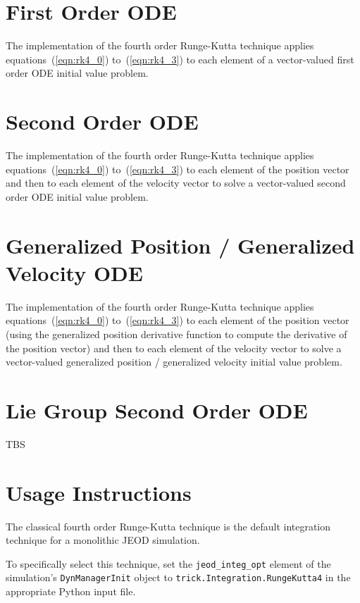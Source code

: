 \section{First Order ODE}

The \erseven implementation of the fourth order Runge-Kutta technique applies
equations~(\ref{eqn:rk4_0}) to~(\ref{eqn:rk4_3})
to each element of a vector-valued first order ODE initial value problem.

\section{Second Order ODE}

The \erseven implementation of the fourth order Runge-Kutta technique applies
equations~(\ref{eqn:rk4_0}) to~(\ref{eqn:rk4_3})
to each element of the position vector and then
to each element of the velocity vector to solve a
vector-valued second order ODE initial value problem.

\section{Generalized Position / Generalized Velocity ODE}

The \erseven implementation of the fourth order Runge-Kutta technique applies
equations~(\ref{eqn:rk4_0}) to~(\ref{eqn:rk4_3})
to each element of the position vector (using the generalized position
derivative function to compute the derivative of the position vector)
and then to each element of the velocity vector to solve a
vector-valued generalized position / generalized velocity initial value problem.


\section{Lie Group Second Order ODE}

TBS


\section{Usage Instructions}
The classical fourth order Runge-Kutta technique is the default integration
technique for a monolithic JEOD simulation.

To specifically select this technique,
set the {\tt{jeod\_integ\_opt}} element of the simulation's
{\tt{DynManagerInit}} object to {\tt{trick.Integration.RungeKutta4}}
in the appropriate Python input file.
